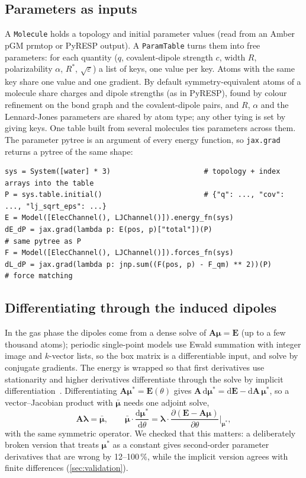 \documentclass[11pt]{article}
\newcommand{\code}[1]{\texttt{#1}}
\newcommand{\dd}{\mathrm{d}}
\begin{document}
\subsection{Parameters as inputs}
A \code{Molecule} holds a topology and initial parameter values (read from an Amber pGM prmtop or
PyRESP output). A \code{ParamTable} turns them into free parameters: for each quantity ($q$,
covalent-dipole strength $c$, width $R$, polarizability $\alpha$, $R^*$, $\sqrt\varepsilon$) a list
of keys, one value per key. Atoms with the same key share one value and one gradient. By default
symmetry-equivalent atoms of a molecule share charges and dipole strengths (as in PyRESP), found
by colour refinement on the bond graph and the covalent-dipole pairs, and $R$, $\alpha$ and the
Lennard-Jones parameters are shared by atom type; any other tying is set by giving keys. One table
built from several molecules ties parameters across them. The parameter pytree is an argument of
every energy function, so \code{jax.grad} returns a pytree of the same shape:

\begin{lstlisting}
sys = System([water] * 3)                      # topology + index arrays into the table
P = sys.table.initial()                        # {"q": ..., "cov": ..., "lj_sqrt_eps": ...}
E = Model([ElecChannel(), LJChannel()]).energy_fn(sys)
dE_dP = jax.grad(lambda p: E(pos, p)["total"])(P)                        # same pytree as P
F = Model([ElecChannel(), LJChannel()]).forces_fn(sys)
dL_dP = jax.grad(lambda p: jnp.sum((F(pos, p) - F_qm) ** 2))(P)          # force matching
\end{lstlisting}

\subsection{Differentiating through the induced dipoles}
In the gas phase the dipoles come from a dense solve of $\bm A\bm\mu=\bm E$ (up to a few thousand
atoms); periodic single-point models use Ewald summation with integer image and $k$-vector lists,
so the box matrix is a differentiable input, and solve by conjugate gradients. The energy is
wrapped so that first derivatives use stationarity and higher derivatives differentiate through
the solve by implicit differentiation~\cite{blondel2022implicit}. Differentiating $\bm A\bm\mu^*=
\bm E(\theta)$ gives $\bm A\,\dd\bm\mu^*=\dd\bm E-\dd\bm A\,\bm\mu^*$, so a vector--Jacobian
product with $\bar{\bm\mu}$ needs one adjoint solve,
\begin{equation}\label{eq:adjoint}
\bm A\bm\lambda=\bar{\bm\mu},\qquad
\bar{\bm\mu}\cdot\frac{\dd\bm\mu^*}{\dd\theta}=\bm\lambda\cdot\frac{\partial(\bm E-\bm A\bm\mu)}{\partial\theta}\Big|_{\bm\mu^*},
\end{equation}
with the same symmetric operator. We checked that this matters: a deliberately broken version that
treats $\bm\mu^*$ as a constant gives second-order parameter derivatives that are wrong by
12--100\,\%, while the implicit version agrees with finite differences
(\cref{sec:validation}).
\end{document}
